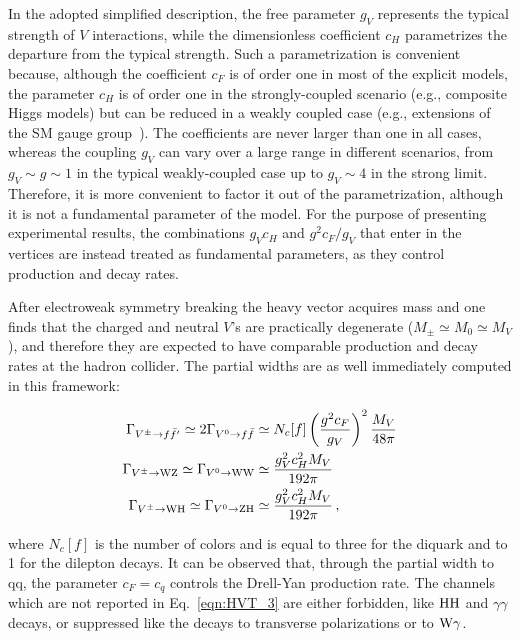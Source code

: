In the adopted simplified description, the free parameter $g_V$ represents the typical strength of $V$ interactions, while the dimensionless coefficient $c_H$ parametrizes the departure from the typical strength.
Such a parametrization is convenient because, although the coefficient $c_F$ is of order one in most of the explicit models, the parameter $c_H$ is of order one in the strongly-coupled scenario (e.g., composite Higgs models) but can be reduced in a weakly coupled case (e.g., extensions of the SM gauge group~\cite{PhysRevD.22.727,Altarelli}). The coefficients are never larger than one in all cases, whereas the coupling $g_V$ can vary over a large range in different scenarios, from $g_V \sim g \sim 1$ in the typical weakly-coupled case up to $g_V \sim 4$ in the strong limit. Therefore, it is more convenient to factor it out of the parametrization, although it is not a fundamental parameter of the model. For the purpose of presenting experimental results, the combinations $g_Vc_H$ and $g^2c_F/g_V$ that enter in the vertices are instead treated as fundamental parameters, as they control production and decay rates.

After electroweak symmetry breaking the heavy vector acquires mass and one finds that the charged and neutral $V$'s are practically degenerate ($M_\pm \simeq M_0 \simeq M_V$),
and therefore they are expected to have comparable production and decay rates at the hadron collider. The partial widths are as well immediately computed in this framework:

\begin{eqnarray}\label{eqn:HVT_3}
\Gamma_{V^\pm \rightarrow f\bar{f}^\prime} \simeq 2\Gamma_{V^0 \rightarrow f\bar{f}} & \simeq N_c[f] \left( \frac{g^2c_F}{g_V} \right)^2\frac{M_V}{48\pi}\nonumber \\
\Gamma_{V^\pm \rightarrow \mathrm{W}\mathrm{Z}} \simeq \Gamma_{V^0 \rightarrow \mathrm{W}\mathrm{W}} & \simeq \frac{g^2_Vc^2_HM_V}{192\pi}\\
\Gamma_{V^\pm \rightarrow \mathrm{W}\mathrm{H}} \simeq \Gamma_{V^0 \rightarrow \mathrm{Z}\mathrm{H}} & \simeq \frac{g^2_Vc^2_HM_V}{192\pi}\, , \nonumber
\end{eqnarray}

\noindent where $N_c[f]$ is the number of colors and is equal to three for the diquark and to 1 for the dilepton decays.
It can be observed that, through the partial width to qq, the parameter $c_F = c_q$ controls the Drell-Yan production rate.
The channels which are not reported in Eq.~\ref{eqn:HVT_3} are either forbidden, like $\mathrm{H}\mathrm{H}$ and $\gamma\gamma$ decays, or suppressed like the decays to transverse polarizations or to $\mathrm{W}\gamma$.

